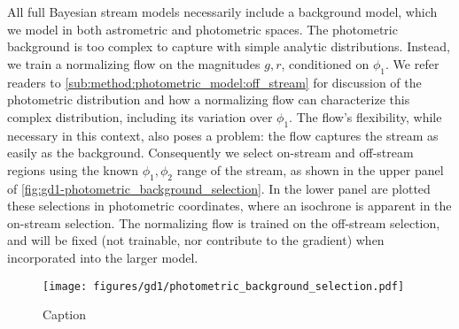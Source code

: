 \documentclass[twocolumn]{aastex631}
\begin{document}
        All full Bayesian stream models necessarily include a background model,
        which we model in both astrometric and photometric spaces.
        The photometric background is too complex to capture with simple analytic
        distributions. Instead, we train a normalizing flow on the magnitudes $g, r$,
        conditioned on $\phi_1$. We refer readers to
        \autoref{sub:method:photometric_model:off_stream} for discussion of the photometric distribution and how a normalizing flow
        can characterize this complex distribution, including its variation over $\phi_1$.
        The flow's flexibility, while necessary in this context, also poses
        a problem: the flow captures the stream as easily as the background.
        Consequently we select on-stream and off-stream regions using the known
        $\phi_1,\phi_2$ range of the stream, as shown in the
        upper panel of \autoref{fig:gd1-photometric_background_selection}.
        In the lower panel are plotted these selections in photometric coordinates,
        where an isochrone is apparent in the on-stream selection.
        The normalizing flow is trained on the off-stream selection, and will be
        fixed (not trainable, nor contribute to the gradient) when incorporated into the larger model.

        \begin{figure}
            \centering
            \texttt{[image: figures/gd1/photometric\_background\_selection.pdf]}
            \caption{Caption}
            \label{fig:gd1-photometric_background_selection}
        \end{figure}
\end{document}
